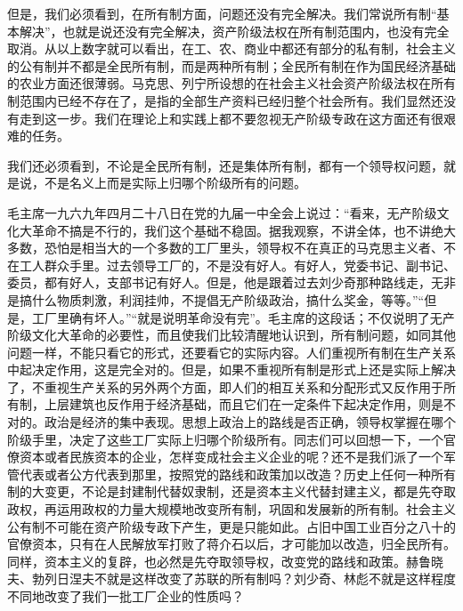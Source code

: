 \begin{maonote}
但是，我们必须看到，在所有制方面，问题还没有完全解决。我们常说所有制“基本解决”，也就是说还没有完全解决，资产阶级法权在所有制范围内，也没有完全取消。从以上数字就可以看出，在工、农、商业中都还有部分的私有制，社会主义的公有制并不都是全民所有制，而是两种所有制；全民所有制在作为国民经济基础的农业方面还很薄弱。马克思、列宁所设想的在社会主义社会资产阶级法权在所有制范围内已经不存在了，是指的全部生产资料已经归整个社会所有。我们显然还没有走到这一步。我们在理论上和实践上都不要忽视无产阶级专政在这方面还有很艰难的任务。

我们还必须看到，不论是全民所有制，还是集体所有制，都有一个领导权问题，就是说，不是名义上而是实际上归哪个阶级所有的问题。

毛主席一九六九年四月二十八日在党的九届一中全会上说过：“看来，无产阶级文化大革命不搞是不行的，我们这个基础不稳固。据我观察，不讲全体，也不讲绝大多数，恐怕是相当大的一个多数的工厂里头，领导权不在真正的马克思主义者、不在工人群众手里。过去领导工厂的，不是没有好人。有好人，党委书记、副书记、委员，都有好人，支部书记有好人。但是，他是跟着过去刘少奇那种路线走，无非是搞什么物质刺激，利润挂帅，不提倡无产阶级政治，搞什么奖金，等等。”“但是，工厂里确有坏人。”“就是说明革命没有完”。毛主席的这段话；不仅说明了无产阶级文化大革命的必要性，而且使我们比较清醒地认识到，所有制问题，如同其他问题一样，不能只看它的形式，还要看它的实际内容。人们重视所有制在生产关系中起决定作用，这是完全对的。但是，如果不重视所有制是形式上还是实际上解决了，不重视生产关系的另外两个方面，即人们的相互关系和分配形式又反作用于所有制，上层建筑也反作用于经济基础，而且它们在一定条件下起决定作用，则是不对的。政治是经济的集中表现。思想上政治上的路线是否正确，领导权掌握在哪个阶级手里，决定了这些工厂实际上归哪个阶级所有。同志们可以回想一下，一个官僚资本或者民族资本的企业，怎样变成社会主义企业的呢？还不是我们派了一个军管代表或者公方代表到那里，按照党的路线和政策加以改造？历史上任何一种所有制的大变更，不论是封建制代替奴隶制，还是资本主义代替封建主义，都是先夺取政权，再运用政权的力量大规模地改变所有制，巩固和发展新的所有制。社会主义公有制不可能在资产阶级专政下产生，更是只能如此。占旧中国工业百分之八十的官僚资本，只有在人民解放军打败了蒋介石以后，才可能加以改造，归全民所有。同样，资本主义的复辟，也必然是先夺取领导权，改变党的路线和政策。赫鲁晓夫、勃列日涅夫不就是这样改变了苏联的所有制吗？刘少奇、林彪不就是这样程度不同地改变了我们一批工厂企业的性质吗？


\end{maonote}
